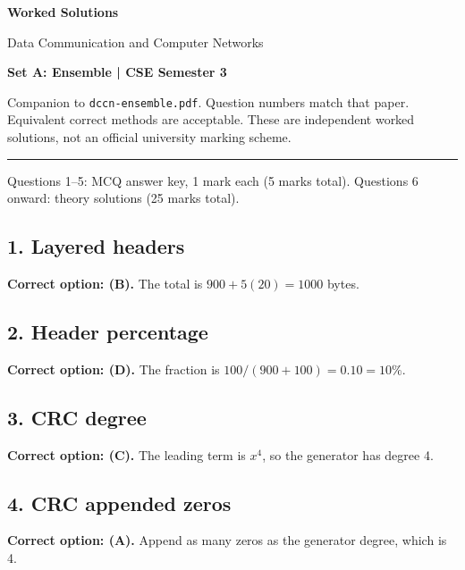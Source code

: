 \documentclass[11pt,a4paper]{article}
\begin{document}
{\LARGE\bfseries Worked Solutions}\par{\large Data Communication and Computer Networks}\par\textbf{Set A: Ensemble | CSE Semester 3}\par
Companion to \texttt{dccn-ensemble.pdf}. Question numbers match that paper. Equivalent correct methods are acceptable. These are independent worked solutions, not an official university marking scheme.\par\medskip\hrule\medskip
Questions 1--5: MCQ answer key, 1 mark each (5 marks total). Questions 6 onward: theory solutions (25 marks total).\par
\noindent\begin{minipage}{\linewidth}\subsection*{1. Layered headers}
\textbf{Correct option: (B).} The total is $900+5(20)=1000$ bytes.
\end{minipage}\par\medskip
\noindent\begin{minipage}{\linewidth}\subsection*{2. Header percentage}
\textbf{Correct option: (D).} The fraction is $100/(900+100)=0.10=10\%$.
\end{minipage}\par\medskip
\noindent\begin{minipage}{\linewidth}\subsection*{3. CRC degree}
\textbf{Correct option: (C).} The leading term is $x^4$, so the generator has degree 4.
\end{minipage}\par\medskip
\noindent\begin{minipage}{\linewidth}\subsection*{4. CRC appended zeros}
\textbf{Correct option: (A).} Append as many zeros as the generator degree, which is 4.
\end{minipage}\par\medskip
\end{document}
